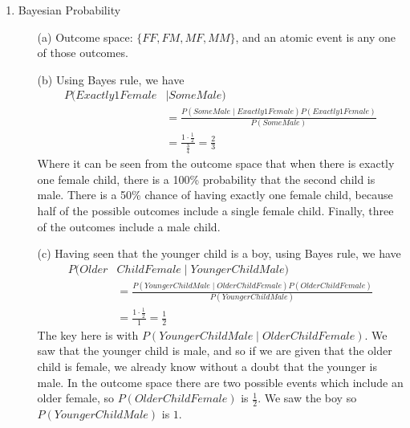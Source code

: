 \documentclass[12pt]{article}
\begin{document}
\begin{enumerate}
\begin{enumerate}
  \end{enumerate}
  
  \item Bayesian Probability \\
  	\begin{enumerate}
  		\item[(a)] Outcome space: $\{FF, FM, MF, MM\}$, and an atomic event is any one of those outcomes. 
  		\item[(b)] Using Bayes rule, we have \\
	  		\begin{align*}
	  			 P(Exactly 1 Female &\mid Some Male ) \\  &= \frac{P( Some Male \mid Exactly 1 Female) P(Exactly 1 Female)}{P(Some Male)} \\
	  			 & = \frac{1 \cdot \frac{1}{2}}{\frac{3}{4}} = \frac{2}{3}
	  		\end{align*} 
	  		Where it can be seen from the outcome space that when there is exactly one female child, there is a 100\% probability that the second child is male. There is a 50\% chance of having exactly one female child, because half of the possible outcomes include a single female child. Finally, three of the outcomes include a male child. \\
		\item[(c)] Having seen that the younger child is a boy, using Bayes rule, we have
	  		\begin{align*}
	  			 P( Older & Child Female \mid Younger Child Male ) \\
	  			  &= \frac{P( Younger Child Male \mid Older Child Female ) P(Older Child Female)}{P(Younger Child Male)} \\
	  			 & = \frac{1 \cdot \frac{1}{2}}{1} = \frac{1}{2}
	  		\end{align*} 
	  		The key here is with $P( Younger Child Male \mid Older Child Female )$. We saw that the younger child is male, and so if we are given that the older child is female, we already know without a doubt that the younger is male. In the outcome space there are two possible events which include an older female, so $P(Older Child Female)$ is $\frac{1}{2}$. We saw the boy so $P(Younger Child Male)$ is $1$.
	  	 
	  		
  	\end{enumerate}
  	

\end{enumerate}
\end{document}
